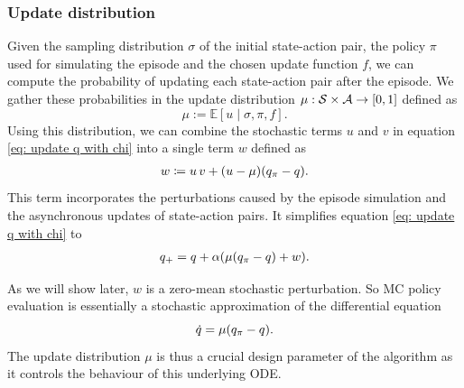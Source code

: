 \subsubsection{Update distribution}

Given the sampling distribution $\sigma$ of the initial state-action pair, the policy $\pi$ used for simulating the episode and the chosen update function $f$,
we can compute the probability of updating each state-action pair after the episode.
We gather these probabilities in the update distribution $\mu : \mathcal{S} \times \mathcal{A} \to [0,1]$ defined as
\[
\mu := \mathbb E [ u \mid \sigma, \pi, f] .
\]
Using this distribution, we can combine the stochastic terms $u$ and $v$ in equation \eqref{eq: update q with chi} into a single term $w$ defined as
\begin{align}
\label{eq: definition combined noise}
    w
    \coloneqq 
    u \, v + (u - \mu) ( q_{\pi} - q ) .
\end{align}
This term incorporates the perturbations caused by the episode simulation and the asynchronous updates of state-action pairs.
It simplifies equation \eqref{eq: update q with chi} to
\begin{align}
\label{eq: mcopi not yet sri}
    q_+
    =
    q + \alpha ( \mu ( q_{\pi} - q ) + w ) .
\end{align}

\vspace{-0.4cm}

\begin{remark}
\label{rmk: approximate ODE}
As we will show later, $w$ is a zero-mean stochastic perturbation.
So MC policy evaluation is essentially a stochastic approximation of the differential equation
\[
\dot q = \mu ( q_{\pi} - q ) .
\]
The update distribution $\mu$ 
is thus a crucial design parameter of the algorithm
as it controls the behaviour of this underlying ODE.
\end{remark}

\vspace{-0.3cm}

